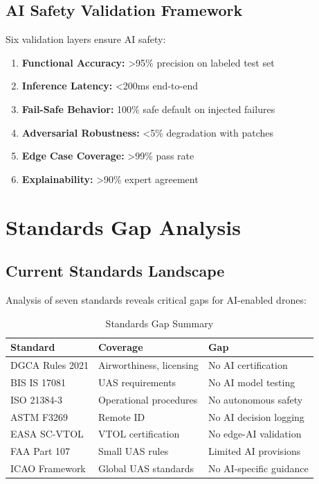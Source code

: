 \documentclass[12pt,a4paper]{article}
\begin{document}
\subsection{AI Safety Validation Framework}
Six validation layers ensure AI safety:

\begin{enumerate}
    \item \textbf{Functional Accuracy:} >95\% precision on labeled test set
    \item \textbf{Inference Latency:} <200ms end-to-end
    \item \textbf{Fail-Safe Behavior:} 100\% safe default on injected failures
    \item \textbf{Adversarial Robustness:} <5\% degradation with patches
    \item \textbf{Edge Case Coverage:} >99\% pass rate
    \item \textbf{Explainability:} >90\% expert agreement
\end{enumerate}

\section{Standards Gap Analysis}

\subsection{Current Standards Landscape}
Analysis of seven standards reveals critical gaps for AI-enabled drones:

\begin{table}[H]
\centering
\caption{Standards Gap Summary}
\begin{tabular}{lll}
\toprule
Standard & Coverage & Gap \\
\midrule
DGCA Rules 2021 & Airworthiness, licensing & No AI certification \\
BIS IS 17081 & UAS requirements & No AI model testing \\
ISO 21384-3 & Operational procedures & No autonomous safety \\
ASTM F3269 & Remote ID & No AI decision logging \\
EASA SC-VTOL & VTOL certification & No edge-AI validation \\
FAA Part 107 & Small UAS rules & Limited AI provisions \\
ICAO Framework & Global UAS standards & No AI-specific guidance \\
\bottomrule
\end{tabular}
\end{table}
\end{document}
